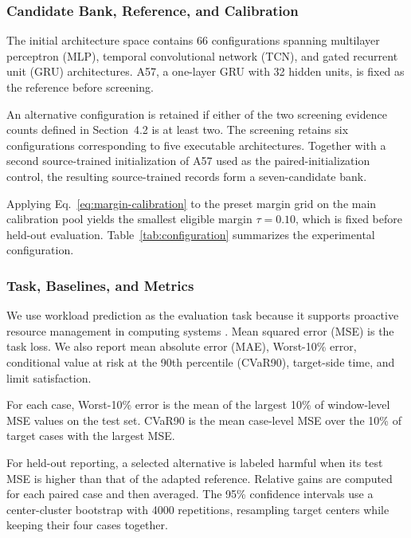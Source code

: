 \documentclass[a4paper,fleqn]{cas-sc}
\begin{document}
\subsubsection{Candidate Bank, Reference, and Calibration}
\label{subsubsec:bank-calibration}

The initial architecture space contains 66 configurations spanning multilayer
perceptron (MLP), temporal convolutional network (TCN), and gated recurrent
unit (GRU) architectures. A57, a one-layer GRU with 32 hidden units, is fixed
as the reference before screening.

An alternative configuration is retained if either of the two screening
evidence counts defined in Section~4.2 is at least two. The screening retains six configurations corresponding to five executable
architectures. Together with a second source-trained initialization of A57 used
as the paired-initialization control, the resulting source-trained records form
a seven-candidate bank.

Applying Eq.~\eqref{eq:margin-calibration} to the preset margin grid on the
main calibration pool yields the smallest eligible margin $\tau=0.10$, which
is fixed before held-out evaluation. Table~\ref{tab:configuration}
summarizes the experimental configuration.



\subsubsection{Task, Baselines, and Metrics}

We use workload prediction as the evaluation task because it supports
proactive resource management in computing systems
\cite{ref17,ref18,ref19}. Mean squared error (MSE) is the task loss. We also
report mean absolute error (MAE), Worst-10\% error, conditional value at risk
at the 90th percentile (CVaR90), target-side time, and limit satisfaction.

For each case, Worst-10\% error is the mean of the largest 10\% of window-level
MSE values on the test set. CVaR90 is the mean case-level MSE over the 10\% of
target cases with the largest MSE.

For held-out reporting, a selected alternative is labeled harmful when its
test MSE is higher than that of the adapted reference. Relative gains are
computed for each paired case and then averaged. The 95\% confidence intervals
use a center-cluster bootstrap with 4000 repetitions, resampling target centers
while keeping their four cases together.
\end{document}
